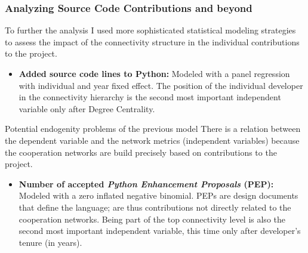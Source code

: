 \documentclass[ignorenonframetext,red,8pt,notes=hide]{beamer}
\begin{document}
\begin{frame}
\frametitle{Analyzing Source Code Contributions and beyond}

To further the analysis I used more sophisticated statistical modeling strategies to assess the impact of the connectivity structure in the individual contributions to the project.

\begin{itemize}

\item \textbf{Added source code lines to Python:} Modeled with a panel regression with individual and year fixed effect. The position of the individual developer in the connectivity hierarchy is the second most important independent variable only after Degree Centrality.

\end{itemize}

\pause

\begin{block}{Potential endogenity problems of the previous model}
There is a relation between the dependent variable and the network metrics (independent variables) because the cooperation networks are build precisely based on contributions to the project.
\end{block}

\begin{itemize}

\item \textbf{Number of accepted \textit{Python Enhancement Proposals} (PEP):} Modeled with a zero inflated negative binomial. PEPs are design documents that define the language; are thus contributions not directly related to the cooperation networks. Being part of the top connectivity level is also the second most important independent variable, this time only after developer's tenure (in years).

\end{itemize}


\end{frame}
\end{document}

